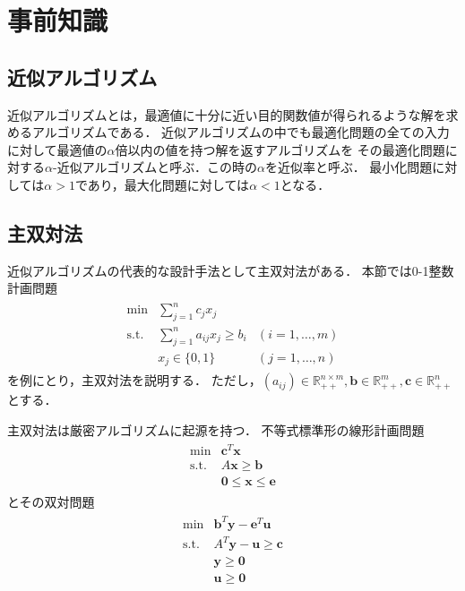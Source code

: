 \documentclass[11pt,dvipdfmx]{jarticle}
\numberwithin{equation}{section}
\begin{document}
\section{事前知識}
    \subsection{近似アルゴリズム}
        近似アルゴリズムとは，最適値に十分に近い目的関数値が得られるような解を求めるアルゴリズムである．
        近似アルゴリズムの中でも最適化問題の全ての入力に対して最適値の$\alpha$倍以内の値を持つ解を返すアルゴリズムを
        その最適化問題に対する$\alpha$-近似アルゴリズムと呼ぶ\cite{apx_des}．この時の$\alpha$を近似率と呼ぶ．
        最小化問題に対しては$\alpha>1$であり，最大化問題に対しては$\alpha<1$となる．
    \subsection{主双対法}
        近似アルゴリズムの代表的な設計手法として主双対法がある\cite{apx_al}．
        本節では0-1整数計画問題
        \begin{align}   
            \begin{array}{cll}
                \mathrm{min } & \displaystyle\sum_{j = 1}^{n}{c_jx_j} & \\
                \mathrm{s.t.} & \displaystyle\sum_{j=1}^{n}{a_{ij}x_j} \ge b_i & (i = 1,\dotsc,m)\\
                                & x_j \in\{0,1\} & (j=1,\dotsc,n) 
            \end{array}
            \label{lp_pd}
        \end{align}
        を例にとり，主双対法を説明する．
        ただし，$(a_{ij})\in\mathbb{R}^{n\times m}_{++},\bm{b}\in\mathbb{R}^{m}_{++},\bm{c}\in\mathbb{R}^{n}_{++}$とする．\par
        主双対法は厳密アルゴリズムに起源を持つ．
        不等式標準形の線形計画問題
        \begin{align}
            \begin{array}{clll}
                \mathrm{min } & \bm{c}^T\bm{x} \\
                \mathrm{s.t.} & A\bm{x}\ge \bm{b} \\
                              & \bm{0} \le \bm{x} \le \bm{e} 
            \end{array}
        \end{align}             
        とその双対問題
        \begin{align}
            \begin{array}{clll}
                \mathrm{min } & \bm{b}^T\bm{y} - \bm{e}^T\bm{u} \\
                \mathrm{s.t.} & A^T\bm{y} - \bm{u}\ge \bm{c} \\
                              & \bm{y} \ge \bm{0}\\
                              & \bm{u} \ge \bm{0}
            \end{array}
        \end{align}
\end{document}
